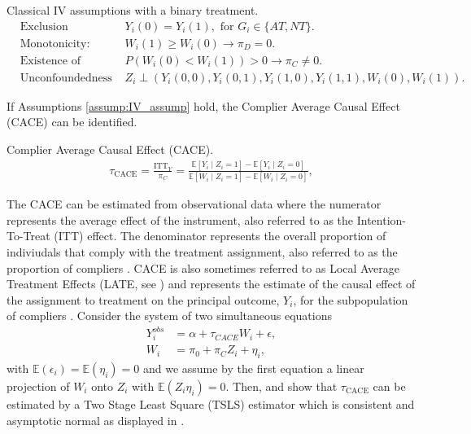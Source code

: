 \begin{assump}{Classical IV assumptions with a binary treatment.}
   \label{assump:IV_assump} 
   \begin{align*}
      &\text{Exclusion restriction: }& Y_i(0) = Y_i(1), \text{ for } G_i \in \{AT, NT \}. \\
      &\text{Monotonicity: }& W_i(1) \geq W_i(0) \rightarrow \pi_D = 0. \\
      &\text{Existence of compliers: }& P(W_i(0) < W_i(1)) > 0 \rightarrow \pi_C \ne 0. \\
      &\text{Unconfoundedness of IV: }& Z_i \perp (Y_i(0, 0), Y_i(0, 1), Y_i(1, 0), Y_i(1, 1), W_i(0), W_i(1)). 
   \end{align*}
\end{assump}

If Assumptions \ref{assump:IV_assump} hold, the Complier Average Causal Effect (CACE) can be identified.

\begin{defn}{Complier Average Causal Effect (CACE).}
   \label{defn:CACE}
   \begin{align*}
      \tau_{\text{CACE}} = \frac{\text{ITT}_{Y}}{\pi_C} = \frac{\mathbb{E}[Y_i \mid Z_i = 1] - \mathbb{E}[Y_i \mid Z_i = 0]}{\mathbb{E}[W_i \mid Z_i = 1] - \mathbb{E}[W_i \mid Z_i = 0]},
   \end{align*}
\end{defn}

The CACE can be estimated from observational data where the numerator represents the average effect of the instrument, also referred to as the Intention-To-Treat (ITT) effect. The denominator represents the overall proportion of indiviudals that comply with the treatment assignment, also referred to as the proportion of compliers \cite{Angrist1996}.
CACE is also sometimes referred to as Local Average Treatment Effects (LATE, see \cite{AngristPischke2008}) and represents the estimate of the causal effect of the assignment to treatment on the principal outcome, $Y_i$, for the subpopulation of compliers \cite{ImbensRubin2015}. Consider the system of two simultaneous equations 
\begin{align*}
Y_i^{obs} &= \alpha + \tau_{CACE} W_i + \epsilon, \\
W_i &= \pi_0 + \pi_C Z_i + \eta_i,
\end{align*}
with $\mathbb{E}\left(\epsilon_i \right) = \mathbb{E}\left(\eta_i \right) = 0$ and we assume by the first equation a linear projection of $W_i$ onto $Z_i$ with $\mathbb{E}\left(Z_i \eta_i\right)=0$. Then, \cite{Angrist1996} and \cite{ImbensRubin2015} show that $\tau_{\text{CACE}}$ can be estimated by a Two Stage Least Square (TSLS) estimator which is consistent and asymptotic normal as displayed in \cite{Wooldridge2015}.   

